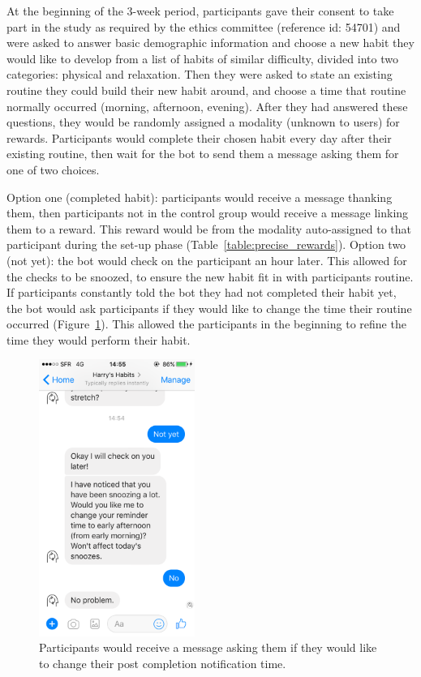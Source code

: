 At the beginning of the 3-week period, participants gave their consent to take part in the study as required by the ethics committee (reference id: 54701) and were asked to answer basic demographic information and choose a new habit they would like to develop from a list of habits of similar difficulty, divided into two categories: physical and relaxation. Then they were asked to state an existing routine they could build their new habit around, and choose a time that routine normally occurred (morning, afternoon, evening). After they had answered these questions, they would be randomly assigned a modality (unknown to users) for rewards. Participants would complete their chosen habit every day after their existing routine, then wait for the bot to send them a message asking them for one of two choices.

Option one (completed habit): participants would receive a message thanking them, then participants not in the control group would receive a message linking them to a reward. This reward would be from the modality auto-assigned to that participant during the set-up phase (Table~\ref{table:precise_rewards}). Option two (not yet): the bot would check on the participant an hour later. This allowed for the checks to be snoozed, to ensure the new habit fit in with participants routine. If participants constantly told the bot they had not completed their habit yet, the bot would ask participants if they would like to change the time their routine occurred (Figure~\ref{fig:snoozing_too_much}). This allowed the participants in the beginning to refine the time they would perform their habit.


\begin{figure}[H]
  \centering
  \includegraphics[width=2in]{resources/design/media/4.png}
  \caption{Participants would receive a message asking them if they would like to change their post completion notification time.}
  \label{fig:snoozing_too_much}
\end{figure}

